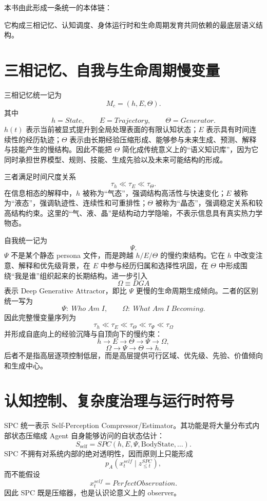 本书由此形成一条统一的本体链：
\begin{statementbox}
\centering
{}
\end{statementbox}
它构成三相记忆、认知调度、身体运行时和生命周期发育共同依赖的最底层语义结构。

\section{三相记忆、自我与生命周期慢变量}

三相记忆统一记为
\[
M_c=(h,E,\Theta).
\]
其中
\[
h=State,\qquad
E=Trajectory,\qquad
\Theta=Generator.
\]
$h(t)$ 表示当前被显式提升到全局处理表面的有限认知状态；$E$ 表示具有时间连续性的经历轨迹；$\Theta$ 表示由长期经验压缩形成、能够参与未来生成、预测、解释与技能产生的慢结构。因此不能把 $\Theta$ 简化成传统意义上的“语义知识库”，因为它同时承担世界模型、规则、技能、生成先验以及未来可能结构的形成。

三者满足时间尺度关系
\[
\tau_h\ll\tau_E\ll\tau_\Theta.
\]
在信息相态的解释中，$h$ 被称为“气态”，强调结构高活性与快速变化；$E$ 被称为“液态”，强调轨迹性、连续性和可重排性；$\Theta$ 被称为“晶态”，强调稳定关系和较高结构约束。这里的“气、液、晶”是结构动力学隐喻，不表示信息具有真实热力学物态。

自我统一记为
\[
\Psi.
\]
$\Psi$ 不是某个静态 persona 文件，而是跨越 $h/E/\Theta$ 的慢约束结构。它在 $h$ 中改变注意、解释和优先级背景，在 $E$ 中参与经历归属和选择性巩固，在 $\Theta$ 中形成围绕“我是谁”组织起来的长期结构。进一步引入
\[
\Omega\equiv DGA
\]
表示 Deep Generative Attractor，即比 $\Psi$ 更慢的生命周期生成倾向。二者的区别统一写为
\[
\Psi:\;Who\;Am\;I,
\qquad
\Omega:\;What\;Am\;I\;Becoming.
\]
因此完整慢变量序列为
\[
\boxed{
\tau_h
\ll
\tau_E
\ll
\tau_\Theta
\ll
\tau_\Psi
\ll
\tau_\Omega
}
\]
并形成自底向上的经验沉降与自顶向下的慢约束：
\[
h\rightarrow E\rightarrow\Theta\rightarrow\Psi\rightarrow\Omega,
\]
\[
\Omega\rightarrow\Psi\rightarrow\Theta\rightarrow h.
\]
后者不是指高层逐项控制低层，而是高层提供可行区域、优先级、先验、价值倾向和生成中心。

\section{认知控制、复杂度治理与运行时符号}

SPC 统一表示 Self-Perception Compressor/Estimator。其功能是将大量分布式内部状态压缩成 Agent 自身能够访问的自状态估计：
\[
S_{\mathrm{self}}
=
SPC(h,E,\Psi,\mathrm{BodyState},\ldots).
\]
SPC 不拥有对系统内部的绝对透明性，因而原则上只能形成
\[
p_A(x_t^{self}\mid z_{\leq t}^{SPC}),
\]
而不能假设
\[
x_t^{self}=PerfectObservation.
\]
因此 SPC 既是压缩器，也是认识论意义上的 observer。


